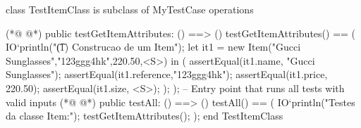 \begin{vdmpp}[breaklines=true]
class TestItemClass is subclass of MyTestCase
operations

(*@
\label{testGetItemAttributes:4}
@*)
 public testGetItemAttributes: () ==> ()
 testGetItemAttributes() == (
    IO`println("\t (1) Construcao de um Item");
    let it1 = new Item("Gucci Sunglasses","123ggg4hk",220.50,<S>) in (
   assertEqual(it1.name, "Gucci Sunglasses");
   assertEqual(it1.reference,"123ggg4hk");
   assertEqual(it1.price, 220.50);
   assertEqual(it1.size, <S>);
   );
 ); 
 -- Entry point that runs all tests with valid inputs
(*@
\label{testAll:15}
@*)
  public testAll: () ==> ()
  testAll() == (
  IO`println("Testes da classe Item:");
   testGetItemAttributes();
  );
end TestItemClass
\end{vdmpp}


